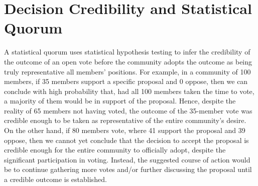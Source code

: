 \documentclass[format=acmsmall, review=true, screen=true, anonymous=true]{acmart}
\begin{document}
%
%
%
%
%

\section{Decision Credibility and Statistical Quorum}
\label{sec:decision-credibility}
A statistical quorum uses statistical hypothesis testing to infer the credibility of the outcome of an open vote before the community adopts the outcome as being truly representative all members' positions.
For example, in a community of 100 members, if 35 members support a specific proposal and 0 oppose, then we can conclude with high probability that, had all 100 members taken the time to vote, a majority of them would be in support of the proposal.  Hence, despite the reality of 65 members not having voted, the outcome of the 35-member vote was credible enough to be taken as representative of the entire community's desire.
On the other hand, if 80 members vote, where 41 support the proposal and 39 oppose, then we cannot yet conclude that the decision to accept the proposal is credible enough for the entire community to officially adopt, despite the significant participation in voting.
Instead, the suggested course of action would be to continue gathering more votes and/or further discussing the proposal until a credible outcome is established.
\end{document}
